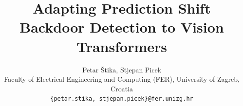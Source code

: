 \documentclass[10pt,twocolumn]{article}
\title{Adapting Prediction Shift Backdoor Detection to Vision Transformers}
\author{Petar \v{S}tika, Stjepan Picek\\
  Faculty of Electrical Engineering and Computing (FER), University of Zagreb, Croatia\\
  \texttt{\{petar.stika, stjepan.picek\}@fer.unizg.hr}}
\date{}
\begin{document}
\maketitle

















\appendix
\onecolumn

\end{document}
